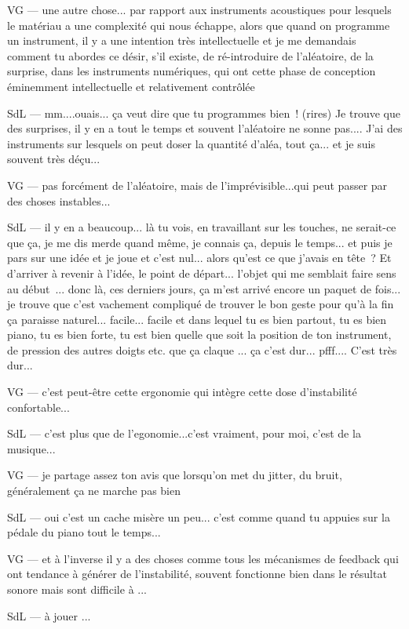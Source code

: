 VG — une autre chose... par rapport aux instruments acoustiques pour lesquels le matériau a une complexité qui nous échappe, alors que quand on programme un instrument, il y a une intention très intellectuelle et je me demandais comment tu abordes ce désir, s'il existe, de ré-introduire de l'aléatoire, de la surprise, dans les instruments numériques, qui ont cette phase de conception éminemment intellectuelle et relativement contrôlée 

SdL — mm....ouais... ça veut dire que tu programmes bien ! (rires) Je trouve que des surprises, il y en a tout le temps et souvent l'aléatoire ne sonne pas.... J'ai des instruments sur lesquels on peut doser la quantité d'aléa, tout ça... et je suis souvent très déçu...  

VG — pas forcément de l'aléatoire, mais de l'imprévisible...qui peut passer par des choses instables... 

SdL — il y en a beaucoup... là tu vois, en travaillant sur les touches, ne serait-ce que ça, je me dis merde quand même, je connais ça, depuis le temps... et puis je pars sur une idée et je joue et c'est nul... alors qu'est ce que j'avais en tête ? Et d'arriver à revenir à l'idée, le point de départ... l'objet qui me semblait faire sens au début ... donc là, ces derniers jours, ça m'est arrivé encore un paquet de fois... je trouve que c'est vachement compliqué de trouver le bon geste pour qu'à la fin ça paraisse naturel... facile... facile et dans lequel tu es bien partout, tu es bien piano, tu es bien forte, tu est bien quelle que soit la position de ton instrument, de pression des autres doigts etc. que ça claque ... ça c'est dur... pfff.... C'est très dur... 

VG — c'est peut-être cette ergonomie qui intègre cette dose d'instabilité confortable... 

SdL — c'est plus que de l'egonomie...c'est vraiment, pour moi, c'est de la musique...  

VG — je partage assez ton avis que lorsqu'on met du jitter, du bruit, généralement ça ne marche pas bien 

SdL — oui c'est un cache misère un peu... c'est comme quand tu appuies sur la pédale du piano tout le temps...  

VG — et à l'inverse il y a des choses comme tous les mécanismes de feedback qui ont tendance à générer de l'instabilité, souvent fonctionne bien dans le résultat sonore mais sont difficile à ... 

SdL — à jouer ... 

